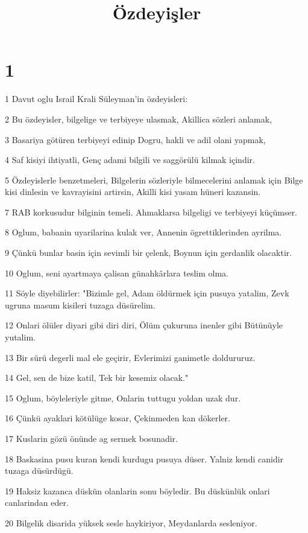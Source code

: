 

\title{Özdeyişler}


\chapter{1}

\par 1 Davut oglu Israil Krali Süleyman'in özdeyisleri:
\par 2 Bu özdeyisler, bilgelige ve terbiyeye ulasmak, Akillica sözleri anlamak,
\par 3 Basariya götüren terbiyeyi edinip Dogru, hakli ve adil olani yapmak,
\par 4 Saf kisiyi ihtiyatli, Genç adami bilgili ve saggörülü kilmak içindir.
\par 5 Özdeyislerle benzetmeleri, Bilgelerin sözleriyle bilmecelerini anlamak için Bilge kisi dinlesin ve kavrayisini artirsin, Akilli kisi yasam hüneri kazansin.
\par 7 RAB korkusudur bilginin temeli. Ahmaklarsa bilgeligi ve terbiyeyi küçümser.
\par 8 Oglum, babanin uyarilarina kulak ver, Annenin ögrettiklerinden ayrilma.
\par 9 Çünkü bunlar basin için sevimli bir çelenk, Boynun için gerdanlik olacaktir.
\par 10 Oglum, seni ayartmaya çalisan günahkârlara teslim olma.
\par 11 Söyle diyebilirler: "Bizimle gel, Adam öldürmek için pusuya yatalim, Zevk ugruna masum kisileri tuzaga düsürelim.
\par 12 Onlari ölüler diyari gibi diri diri, Ölüm çukuruna inenler gibi Bütünüyle yutalim.
\par 13 Bir sürü degerli mal ele geçirir, Evlerimizi ganimetle doldururuz.
\par 14 Gel, sen de bize katil, Tek bir kesemiz olacak."
\par 15 Oglum, böyleleriyle gitme, Onlarin tuttugu yoldan uzak dur.
\par 16 Çünkü ayaklari kötülüge kosar, Çekinmeden kan dökerler.
\par 17 Kuslarin gözü önünde ag sermek bosunadir.
\par 18 Baskasina pusu kuran kendi kurdugu pusuya düser. Yalniz kendi canidir tuzaga düsürdügü.
\par 19 Haksiz kazanca düskün olanlarin sonu böyledir. Bu düskünlük onlari canlarindan eder.
\par 20 Bilgelik disarida yüksek sesle haykiriyor, Meydanlarda sesleniyor.
